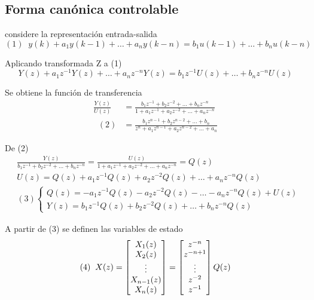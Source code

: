 \subsection{Forma canónica controlable}

considere la representación entrada-salida 
\[
    (1) \;\;
    y(k) + a_{1}y(k-1) + \ldots + a_{n}y(k-n) = b_{1}u(k-1) + \ldots + b_{n}u(k-n)
\]  

Aplicando transformada Z a (1)
\[
    Y(z) + a_{1}z^{-1}Y(z) + \ldots + a_{n}z^{-n}Y(z) = b_{1}z^{-1}U(z) + \ldots + b_{n}z^{-n}U(z)
\]

Se obtiene la función de transferencia
\[
    \begin{split}
        \frac{Y(z)}{U(z)} & = \frac{b_{1}z^{-1} + b_{2}z^{-2} + \ldots + b_{n}z^{-n}}{1 + a_{1}z^{-1} + a_{2}z^{-2} + \ldots + a_{n}z^{-n}} \\ \;\; (2)
        & = \frac{b_{1}z^{n-1} + b_{2}z^{n-2} + \ldots + b_{n}}{z^{n} + a_{1}z^{n-1} + a_{2}z^{n-2} + \ldots + a_{n}} 
    \end{split}
\]

De (2)
\[
    \begin{split}
        & \frac{Y(z)}{b_{1}z^{-1} + b_{2}z^{-2} + \ldots + b_{n}z^{-n}} = \frac{U(z)}{1 + a_{1}z^{-1} + a_{2}z^{-2} + \ldots + a_{n}z^{-n}} = Q(z) \\
        & U(z) = Q(z) + a_{1}z^{-1}Q(z) + a_{2}z^{-2}Q(z) + \ldots + a_{n}z^{-n}Q(z) \\
        & (3)
        \left\{
            \begin{array}{lll}
                Q(z) = - a_{1}z^{-1}Q(z) - a_{2}z^{-2}Q(z) - \ldots - a_{n}z^{-n}Q(z) + U(z) \\
                Y(z) = b_{1}z^{-1}Q(z) + b_{2}z^{-2}Q(z) + \ldots + b_{n}z^{-n}Q(z)
            \end{array}
        \right.
        \end{split}
\]

A partir de (3) se definen las variables de estado
\[
    (4)\;\; X(z) = 
    \begin{bmatrix}
        X_{1}(z) \\
        X_{2}(z) \\
        \vdots \\
        X_{n-1}(z) \\
        X_{n}(z)
    \end{bmatrix} =
    \begin{bmatrix}
        z^{-n} \\
        z^{-n+1} \\
        \vdots \\
        z^{-2} \\
        z^{-1}
    \end{bmatrix} Q(z) \\
\]

